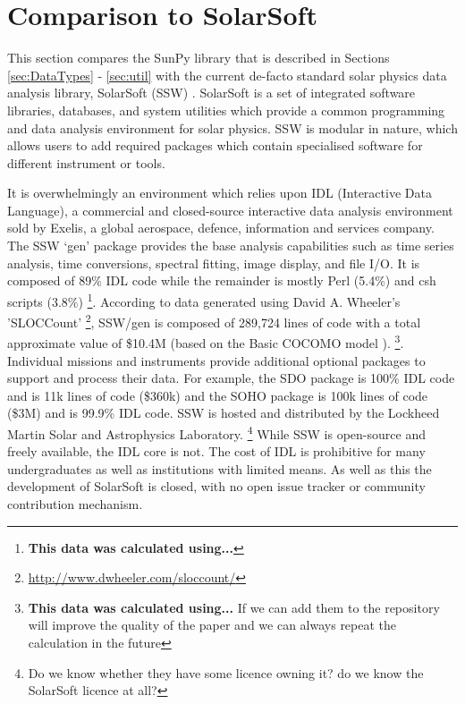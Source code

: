\section{Comparison to SolarSoft}
This section compares the SunPy library that is described in Sections 
\ref{sec:DataTypes} - \ref{sec:util} with the current de-facto standard solar 
physics data analysis library, SolarSoft (SSW) \citep{freeland1998}.
SolarSoft is a set of integrated software libraries, databases, and system 
utilities which provide a common programming and data analysis environment for 
solar physics. SSW is modular in nature, which allows users to add required 
packages which contain specialised software for different instrument or tools.

It is overwhelmingly an environment which relies upon IDL (Interactive Data 
Language), a commercial and closed-source interactive data analysis environment 
sold by Exelis, a global aerospace, defence, information and services company. 
The SSW `gen' package provides the base analysis capabilities such as time 
series analysis, time conversions, spectral fitting, image display, and file 
I/O. It is composed of 89\% IDL code while the remainder is mostly Perl (5.4\%) 
and csh scripts (3.8\%) \footnote{{\bf This data was calculated using...}}. 
According to data generated using David A. Wheeler's 'SLOCCount' 
\footnote{\url{http://www.dwheeler.com/sloccount/}}, SSW/gen is composed of 
289,724 lines of code with a total approximate value of \$10.4M (based on the 
Basic COCOMO model \citep{_cocomo_2014}). \footnote{{\bf This data was 
calculated using...} If we can add them to the repository will improve the 
quality of the paper and we can always repeat the calculation in the future}. 
Individual missions and instruments provide additional optional packages to 
support and process their data. For example, the SDO package \citep{sdo} is 
100\% IDL code and is 11k lines of code (\$360k) and the SOHO package 
\citep{soho} is 100k lines of code (\$3M) and is 99.9\% IDL code. SSW is hosted 
and distributed by the Lockheed Martin Solar and Astrophysics Laboratory.
\footnote{Do we know whether they have some licence owning it? do we know the 
SolarSoft licence at all?}
While SSW is open-source and freely available, the IDL core is not. The cost 
of IDL is prohibitive for many undergraduates as well as institutions 
with limited means. As well as this the development of SolarSoft is closed, 
with no open issue tracker or community contribution mechanism.

